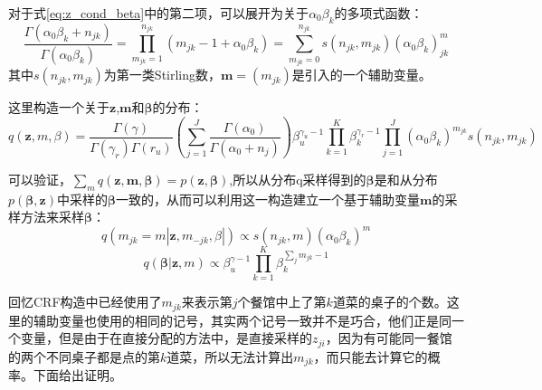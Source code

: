 对于式\eqref{eq:z_cond_beta}中的第二项，可以展开为关于$\alpha_0\beta_k$的多项式函数：
\begin{equation}
\frac{\Gamma(\alpha_0\beta_k+n_{jk})}{\Gamma(\alpha_0\beta_k)} = \prod_{m_{jk}=1}^{n_{jk}}(m_{jk}-1+\alpha_0\beta_k) = \sum_{m_{jk}=0}^{n_{jk}} s(n_{jk},m_{jk}){(\alpha_0\beta_k)}^m_{jk}
\end{equation}
其中$s(n_{jk},m_{jk})$为第一类Stirling数，${\bm m} = (m_{jk})$是引入的一个辅助变量。

这里构造一个关于${\bm z}$,${\bm m}$和${\bm \beta}$的分布：
\begin{equation}
q({\bm z,m,\beta}) = \frac{\Gamma(\gamma)}{\Gamma(\gamma_r)\Gamma(r_u)}(\sum_{j=1}^J\frac{\Gamma(\alpha_0)}{\Gamma(\alpha_0+n_j)})\beta_u^{\gamma_u-1}\prod_{k=1}^{K}\beta_k^{\gamma_r-1}\prod_{j=1}^{J}(\alpha_0\beta_k)^{m_{jk}}s(n_{jk},m_{jk})
\end{equation}

可以验证，$\sum_m q({\bm z},{\bm m},{\bm \beta}) = p({\bm z},{\bm \beta})$,所以从分布q采样得到的${\bm \beta}$是和从分布$p({\bm \beta},{\bm z})$中采样的${\bm \beta}$一致的，从而可以利用这一构造建立一个基于辅助变量${\bm m}$的采样方法来采样${\bm \beta}$：
\begin{equation}
q(m_{jk} = m|{\bm z,m_{-jk},\beta}|) \propto s(n_{jk},m)(\alpha_0\beta_k)^m \label{eq:m_cond_beta}
\end{equation}
\begin{equation} 
q({\bm \beta}|{\bm z,m}) \propto \beta_u^{\gamma-1}\prod_{k=1}^{K}\beta_k^{{\sum_{j}m_{jk}}-1} \label{eq:beta_cond_m}
\end{equation} 

回忆CRF构造中已经使用了$m_{jk}$来表示第$j$个餐馆中上了第$k$道菜的桌子的个数。这里的辅助变量也使用的相同的记号，其实两个记号一致并不是巧合，他们正是同一个变量，但是由于在直接分配的方法中，是直接采样的$z_{ji}$，因为有可能同一餐馆的两个不同桌子都是点的第$k$道菜，所以无法计算出$m_{jk}$，而只能去计算它的概率。下面给出证明。

